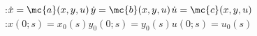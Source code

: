 \begin{emphbox}
    :\hfil $\dot{x}=\mc{a}(x,y,u)$\hfil $\dot{y}=\mc{b}(x,y,u)$\hfil $\dot{u}=\mc{c}(x,y,u)$\\
    :\hfil $x(0;s)=x_0(s)$\hfil $y_0(0;s)=y_0(s)$\hfil $u(0;s)=u_0(s)$
\end{emphbox}


